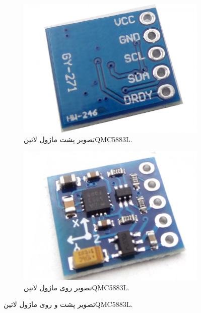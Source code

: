 \begin{figure}[!h]
	\begin{subfigure}{0.5\linewidth}
		\includegraphics[width=\linewidth]{Assets/QMC5883Lback.jpg}
		\caption{تصویر پشت ماژول ‌لاتین{QMC5883L}.}
		\label{fig:BMP180back}
	\end{subfigure}
	\begin{subfigure}{0.5\linewidth}
		\includegraphics[width=\linewidth]{Assets/QMC5883Lfront.jpg}
		\caption{تصویر روی ماژول ‌لاتین{QMC5883L}.}
		\label{fig:QMC5883Lfront}
	\end{subfigure}
	\caption{تصویر پشت و روی ماژول ‌لاتین{QMC5883L}.}
	\label{fig:QMC5883L}
\end{figure}

